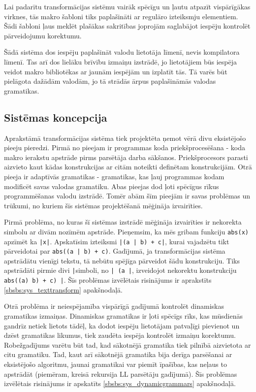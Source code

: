 Lai padarītu transformācijas sistēmu vairāk spēcīgu un ļautu atpazīt vispārīgākas virknes, tās makro šabloni tiks paplašināti ar regulāro izteiksmju elementiem. Šādi šabloni ļaus meklēt plašākas sakritības joprojām saglabājot iespēju kontrolēt pārveidojumu korektumu.

Šādā sistēma dos iespēju paplašināt valodu lietotāja līmenī, nevis kompilatora līmenī. Tas arī dos lielāku brīvību izmaiņu izstrādē, jo lietotājiem būs iespēja veidot makro bibliotēkas ar jaunām iespējām un izplatīt tās. Tā varēs būt pielāgota dažādām valodām, jo tā strādās ārpus paplašināmās valodas gramatikas.

\subsection{\label{sbs:sys_approach}Sistēmas koncepcija}

Aprakstāmā transformācijas sistēma tiek projektēta ņemot vērā divu eksistējošo pieeju pieredzi. Pirmā no pieejam ir programmas koda priekšprocesēšana - koda makro ierakstu apstrāde pirms parsētāja darba sākšanos. Priekšprocesors parasti aizvieto kaut kādas konstrukcijas ar citām noteikti definētam konstrukcijām. Otrā pieeja ir adaptīvās gramatikas - gramatikas, kas ļauj programmas kodam modificēt savas valodas gramatiku. Abas pieejas dod ļoti spēcīgus rīkus programmēšanas valodu izstrādē. Tomēr abām šīm pieejām ir savas problēmas un trūkumi, no kuriem šīs sistēmas projektēšanā mēģināja izvairīties. 

Pirmā problēma, no kuras šī sistēmas izstrādē mēģināja izvairīties ir nekorekta simbolu ar divām nozīmēm apstrāde. Pieņemsim, ka mēs gribam funkciju \verb|abs(x)| apzīmēt ka \verb/|x|/. Apskatīsim izteiksmi \verb/|(a | b) + c|/, kurai vajadzētu tikt pārveidotai par \verb/abs((a | b) + c)/. Gadījumā, ja transformācijas sistēma apstrādātu vienīgi tekstu, tā nebūtu spējīga pārveidot šādu konstrukciju. Tiks apstrādāti pirmie divi \verb/|/simboli, no \verb/| (a |/, izveidojot nekorektu konstrukciju \verb/abs((a) b) + c) |/. Šīs problēmas izvēlētais risinājums ir aprakstīts \ref{sbsbs:sys_texttransform} apakšnodaļā.

Otrā problēma ir neiespējamība vispārīgā gadījumā kontrolēt dinamiskas gramatikas izmaiņas. Dinamiskas gramatikas ir ļoti spēcīgs rīks, kas mūsdienās gandrīz netiek lietots tādēļ, ka dodot iespēju lietotājam patvaļīgi pievienot un dzēst gramatikas likumus, tiek zaudēta iespēja kontrolēt izmaiņu korektumu. Robežgadījums varētu būt tad, kad sākotnējā gramatika tiek pilnībā aizvietota ar citu gramatiku. Tad, kaut arī sākotnējā gramatika bija derīga parsēšanai ar eksistējošo algoritmu, jaunai gramatikai var piemīt īpašības, kas neļaus to apstrādāt (piemēram, kreisā rekursija LL parsētāju gadījumā). Šīs problēmas izvēlētais risinājums ir apskatīts \ref{sbsbs:sys_dynamicgrammars} apakšnodaļā.

